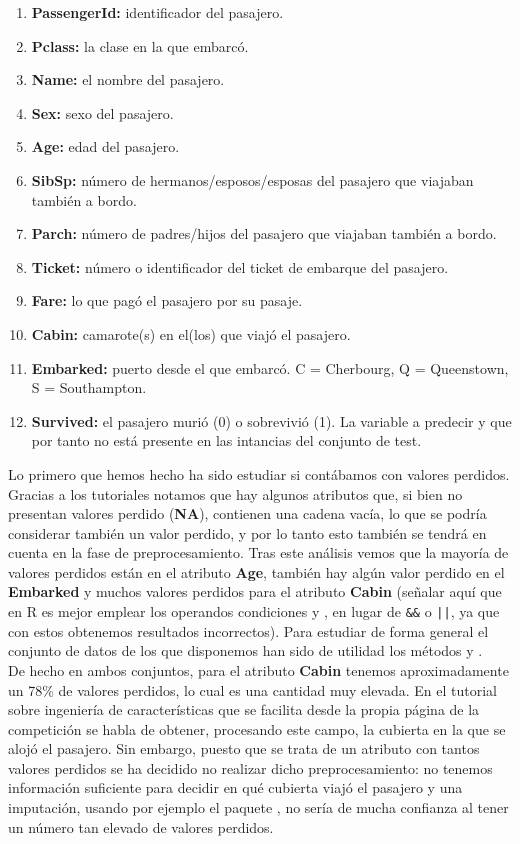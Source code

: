 \begin{enumerate}
\item \textbf{PassengerId: } identificador del pasajero.
\item \textbf{Pclass: } la clase en la que embarcó.
\item \textbf{Name:} el nombre del pasajero.
\item \textbf{Sex: } sexo del pasajero.
\item \textbf{Age: } edad del pasajero.
\item \textbf{SibSp: } número de hermanos/esposos/esposas del pasajero que viajaban también a bordo.
\item \textbf{Parch: } número de padres/hijos del pasajero que viajaban también a bordo.
\item \textbf{Ticket: } número o identificador del ticket de embarque del pasajero.
\item \textbf{Fare: } lo que pagó el pasajero por su pasaje.
\item \textbf{Cabin: } camarote(s) en el(los) que viajó el pasajero.
\item \textbf{Embarked: } puerto desde el que embarcó. C = Cherbourg, Q = Queenstown, S = Southampton.
\item \textbf{Survived: } el pasajero murió (0) o sobrevivió (1). La variable a predecir y que por tanto no está presente en las intancias del conjunto de test.
\end{enumerate}

Lo primero que hemos hecho ha sido estudiar si contábamos con valores perdidos. Gracias a los tutoriales notamos que hay algunos atributos que, si bien no presentan valores perdido (\textbf{NA}), contienen una cadena vacía, lo que se podría considerar también un valor perdido, y por lo tanto esto también se tendrá en cuenta en la fase de preprocesamiento. Tras este análisis vemos que la mayoría de valores perdidos están en el atributo \textbf{Age}, también hay algún valor perdido en el \textbf{Embarked} y muchos valores perdidos para el atributo \textbf{Cabin} (señalar aquí que en R es mejor emplear los operandos condiciones \code{\&} y \code{|}, en lugar de \texttt{\&\&} o \texttt{||}, ya que con estos obtenemos resultados incorrectos). Para estudiar de forma general el conjunto de datos de los que disponemos han sido de utilidad los métodos  y .\\

De hecho en ambos conjuntos, para el atributo \textbf{Cabin} tenemos aproximadamente un 78\% de valores perdidos, lo cual es una cantidad muy elevada. En el tutorial sobre ingeniería de características que se facilita desde la propia página de la competición se habla de obtener, procesando este campo, la cubierta en la que se alojó el pasajero. Sin embargo, puesto que se trata de un atributo con tantos valores perdidos se ha decidido no realizar dicho preprocesamiento: no tenemos información suficiente para decidir en qué cubierta viajó el pasajero y una imputación, usando por ejemplo el paquete , no sería de mucha confianza al tener un número tan elevado de valores perdidos.\\

